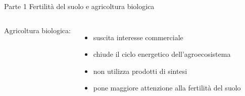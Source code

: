 \documentclass[10pt]{beamer}
\begin{document}
\begin{frame}{Parte 1 \small{Fertilità del suolo e agricoltura biologica}}
  \begin{columns}
    Agricoltura biologica:
    \begin{itemize}[<+->]
      \pause
    \item suscita interesse commerciale
    \item chiude il ciclo energetico \newline dell'agroecosistema
    \item non utilizza prodotti di sintesi
    \item pone maggiore attenzione alla fertilità del suolo
    \end{itemize}
    
\end{columns}
\end{frame}
\end{document}
